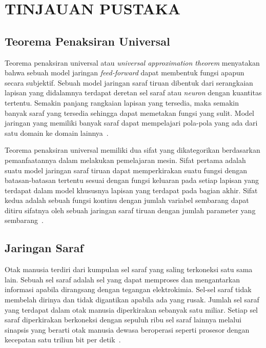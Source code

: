 

\chapter{TINJAUAN PUSTAKA}
\label{cha:2-TinjauanPustaka}

\section{Teorema Penaksiran Universal}
\label{sec:2-TeoremaPenaksiranUniversal}

Teorema penaksiran universal atau \textit{universal approximation theorem} menyatakan bahwa sebuah
model jaringan \textit{feed-forward} dapat membentuk fungsi apapun secara subjektif. Sebuah model
jaringan saraf tiruan dibentuk dari serangkaian lapisan yang didalamnya terdapat deretan sel saraf
atau \textit{neuron} dengan kuantitas tertentu. Semakin panjang rangkaian lapisan yang tersedia,
maka semakin banyak saraf yang tersedia sehingga dapat memetakan fungsi yang sulit.
Model jaringan yang memiliki banyak saraf dapat mempelajari pola-pola yang ada dari satu
domain ke domain lainnya~\cite{2016arXiv160100013G}.

Teorema penaksiran universal memiliki dua sifat yang dikategorikan berdasarkan pemanfaatannya dalam
melakukan pemelajaran mesin. Sifat pertama adalah suatu model jaringan saraf tiruan dapat
memperkirakan suatu fungsi dengan batasan-batasan tertentu sesuai dengan fungsi keluaran pada setiap
lapisan yang terdapat dalam model khususnya lapisan yang terdapat pada bagian akhir.
Sifat kedua adalah sebuah fungsi kontinu dengan jumlah variabel sembarang dapat
ditiru sifatnya oleh sebuah jaringan saraf tiruan dengan jumlah parameter yang sembarang~\cite{2019arXiv191003344K}.

\section{Jaringan Saraf}
\label{sec:2-JaringanSaraf}

Otak manusia terdiri dari kumpulan sel saraf yang saling terkoneksi satu sama lain. Sebuah sel saraf
adalah sel yang dapat memproses dan mengantarkan informasi apabila dirangsang dengan tegangan
elektrokimia. Sel-sel saraf tidak membelah dirinya dan tidak digantikan apabila ada yang
rusak. Jumlah sel saraf yang terdapat dalam otak manusia diperkirakan sebanyak satu miliar. Setiap
sel saraf diperkirakan berkoneksi dengan sepuluh ribu sel saraf lainnya melalui sinapsis yang
berarti otak manusia dewasa beroperasi seperti prosesor dengan kecepatan satu triliun bit per
detik~\cite{10.3389/neuro.09.031.2009}.

